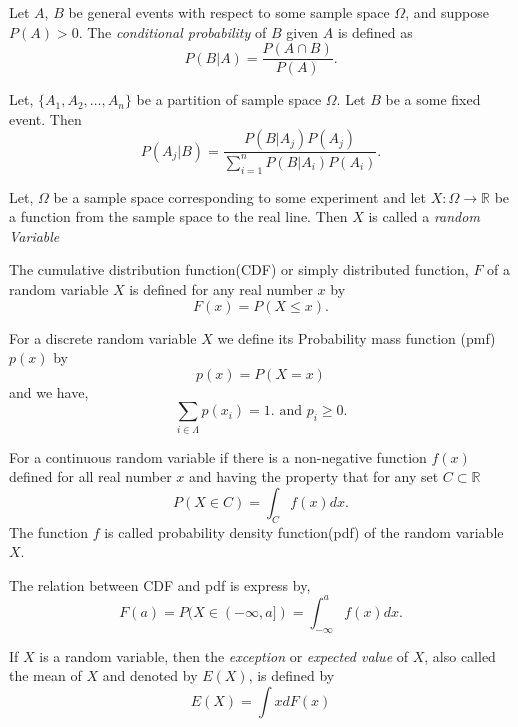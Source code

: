\begin{definition}
	Let $A$, $B$ be general events with respect to some sample space $ \Omega $,
	and suppose $ P(A)>0 $. The \textit{conditional probability} of $ B $ given $ A $ is defined as 
	\[
		P(B|A) = \frac{P(A\cap B)}{P(A)}.
	\]
\end{definition}

\begin{theorem}
	Let, $ \{ A_1,A_2,\ldots,A_n \} $ be a partition of sample space $ \Omega $. 
	Let $ B $ be a some fixed event. Then
	\[
		P(A_j|B) = \frac{P(B|A_j)P(A_j)}{\sum_{i=1}^{n}P(B|A_i)P(A_i) }.
	\]
\end{theorem}

\begin{definition}
	Let, $ \Omega $ be a sample space corresponding to some experiment and let 
	$ X:\Omega\to \mathds{R} $ be a function from the sample space to the real line. 
	Then $ X $ is called a \textit{random Variable}
\end{definition}

\begin{definition}
	The cumulative distribution function(CDF) or simply distributed function, $ F $ of 
	a random variable $ X $ is defined for any real number $ x $ by
	\[
		F(x) = P(X \le x).
	\]
\end{definition}

\begin{definition}
	For a discrete random variable $ X $ we define its Probability mass function (pmf)
	$ p(x) $ by
	\[
		p(x) = P(X=x)
	\]
	and we have,
	\[
		\sum_{i\in \Lambda} p(x_i) = 1. \text{ and } p_i \ge 0. 
	\]
\end{definition}

\begin{definition}
	For a continuous random variable if there is a non-negative function $ f(x) $
	defined for all real number $ x $ and having the property that for any set $ C\subset \mathds{R} $
	\[
		P(X\in C) = \int_{C}f(x) dx 
		.\]
	The function $ f $ is called probability density function(pdf) of the random variable $ X $.
\end{definition}

The relation between CDF and pdf is express by,
\[
	F(a) = P(X\in (-\infty, a]) = \int_{-\infty}^{a} f(x) dx.
\]

\begin{definition}[Expectation]
	If $ X $ is a random variable,
	then the \textit{exception} or \textit{expected value} of $ X $, also called the mean of $ X $ and denoted by $ E(X) $, is defined by
	\[
		E(X) = \int xdF(x) 
	\]
\end{definition}

